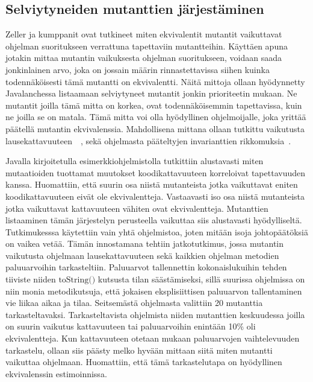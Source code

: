 \documentclass{tktltiki}
\begin{document}
\subsection{Selviytyneiden mutanttien järjestäminen}
Zeller ja kumppanit ovat tutkineet miten ekvivalentit mutantit vaikuttavat ohjelman suoritukseen verrattuna tapettaviin mutantteihin. Käyttäen apuna jotakin mittaa mutantin vaikuksesta ohjelman suoritukseen, voidaan saada jonkinlainen arvo, joka on jossain määrin rinnastettavissa siihen kuinka todennäköisesti tämä mutantti on ekvivalentti. Näitä mittoja ollaan hyödynnetty Javalanchessa listaamaan selviytyneet mutantit jonkin prioriteetin mukaan. Ne mutantit joilla tämä mitta on korkea, ovat todennäköisemmin tapettavissa, kuin ne joilla se on matala. Tämä mitta voi olla hyödyllinen ohjelmoijalle, joka yrittää päätellä mutantin ekvivalenssia. Mahdollisena mittana ollaan tutkittu vaikutusta lausekattavuuteen~\cite{GrunSZ09}~\cite{SchulerZ10}, sekä ohjelmasta pääteltyjen invarianttien rikkomuksia~\cite{SchulerDZ09}.

Javalla kirjoitetulla esimerkkiohjelmistolla tutkittiin alustavasti miten mutaatioiden tuottamat muutokset koodikattavuuteen korreloivat tapettavuuden kanssa. Huomattiin, että suurin osa niistä mutanteista jotka vaikuttavat eniten koodikattavuuteen eivät ole ekvivalentteja. Vastaavasti iso osa niistä mutanteista jotka vaikuttavat kattavuuteen vähiten ovat ekvivalentteja. Mutanttien listaaminen tämän järjestelyn perusteella vaikuttaa siis alustavasti hyödylliseltä. Tutkimukesssa käytettiin vain yhtä ohjelmistoa, joten mitään isoja johtopäätöksiä on vaikea vetää. Tämän innostamana tehtiin jatkotutkimus, jossa mutantin vaikutusta ohjelmaan lausekattavuuteen sekä kaikkien ohjelman metodien paluuarvoihin tarkasteltiin. Paluuarvot tallennettin kokonaislukuihin tehden tiiviste niiden $\text{toString()}$ kutsusta tilan säästämiseksi, sillä suurissa ohjelmissa on niin monia metodikutsuja, että jokaisen eksplisiittisen paluuarvon tallentaminen vie liikaa aikaa ja tilaa. Seitsemästä ohjelmasta valittiin 20 mutanttia tarkasteltavaksi. Tarkasteltavista ohjelmista niiden mutanttien keskuudessa joilla on suurin vaikutus kattavuuteen tai paluuarvoihin enintään 10\% oli ekvivalentteja. Kun kattavuuteen otetaan mukaan paluuarvojen vaihtelevuuden tarkastelu, ollaan siis päästy melko hyvään mittaan siitä miten mutantti vaikuttaa ohjelmaan. Huomattiin, että tämä tarkastelutapa on hyödyllinen ekvivalenssin estimoinnissa. 
\end{document}
